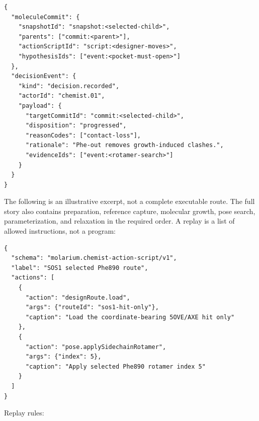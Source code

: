 \noindent\begin{minipage}{\linewidth}
\small
\begin{verbatim}
{
  "moleculeCommit": {
    "snapshotId": "snapshot:<selected-child>",
    "parents": ["commit:<parent>"],
    "actionScriptId": "script:<designer-moves>",
    "hypothesisIds": ["event:<pocket-must-open>"]
  },
  "decisionEvent": {
    "kind": "decision.recorded",
    "actorId": "chemist.01",
    "payload": {
      "targetCommitId": "commit:<selected-child>",
      "disposition": "progressed",
      "reasonCodes": ["contact-loss"],
      "rationale": "Phe-out removes growth-induced clashes.",
      "evidenceIds": ["event:<rotamer-search>"]
    }
  }
}
\end{verbatim}
\end{minipage}

The following is an illustrative excerpt, not a complete executable route. The
full story also contains preparation, reference capture, molecular growth, pose
search, parameterization, and relaxation in the required order. A replay is a
list of allowed instructions, not a program:

\noindent\begin{minipage}{\linewidth}
\small
\begin{verbatim}
{
  "schema": "molarium.chemist-action-script/v1",
  "label": "SOS1 selected Phe890 route",
  "actions": [
    {
      "action": "designRoute.load",
      "args": {"routeId": "sos1-hit-only"},
      "caption": "Load the coordinate-bearing 5OVE/AXE hit only"
    },
    {
      "action": "pose.applySidechainRotamer",
      "args": {"index": 5},
      "caption": "Apply selected Phe890 rotamer index 5"
    }
  ]
}
\end{verbatim}
\end{minipage}

Replay rules:

